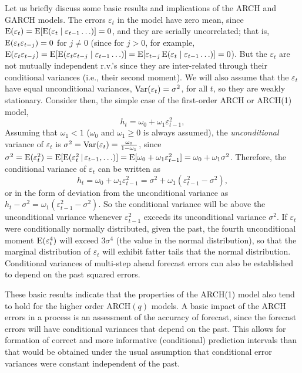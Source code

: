 Let us briefly discuss some basic results and implications of the ARCH and GARCH models.\label{in:garch_model} The errors $\varepsilon_t$ in the model have zero mean, since $\operatorname{E}(\varepsilon_t) = \operatorname{E}[\operatorname{E}(\varepsilon_t \;|\; \varepsilon_{t-1} \ldots)] = 0$, and they are serially uncorrelated; that is, $\operatorname{E}(\varepsilon_t \varepsilon_{t-j}) = 0$ for $j \not= 0$ (since for $j > 0$, for example, $\operatorname{E}(\varepsilon_t \varepsilon_{t-j}) = \operatorname{E}[\operatorname{E}(\varepsilon_t \varepsilon_{t-j} \;|\; \varepsilon_{t-1} \ldots)] = \operatorname{E}[\varepsilon_{t-j} \operatorname{E}(\varepsilon_t \;|\; \varepsilon_{t-1} \ldots)] = 0$). But the $\varepsilon_t$ are not mutually independent r.v.'s since they are inter-related through their conditional variances (i.e., their second moment). We will also assume that the $\varepsilon_t$ have equal unconditional variances, $\operatorname{Var}(\varepsilon_t) = \sigma^2$, for all $t$, so they are weakly stationary. Consider then, the simple case of the first-order ARCH or ARCH(1) model,
	\begin{equation} \label{eqn:2htE}
	h_t = \omega_0 + \omega_1 \varepsilon_{t-1}^2,
	\end{equation}
Assuming that $\omega_1 < 1$ ($\omega_0$ and $\omega_1 \geq 0$ is always assumed), the \emph{unconditional} variance of $\varepsilon_t$ is $\sigma^2= \operatorname{Var}(\varepsilon_t) = \frac{\omega_0}{1 - \omega_1}$, since $\sigma^2 = \operatorname{E}(\varepsilon_t^2) = \operatorname{E}[\operatorname{E}(\varepsilon_t^2 \,|\, \varepsilon_{t-1}, \ldots)] = \operatorname{E}[\omega_0 + \omega_1\varepsilon_{t-1}^2] = \omega_0 + \omega_1\sigma^2$. Therefore, the conditional variance of $\varepsilon_t$ can be written as
	\begin{equation} \label{eqn:2htw}
	h_t = \omega_0 + \omega_1 \varepsilon_{t-1}^2 = \sigma^2 + \omega_1 (\varepsilon_{t-1}^2 - \sigma^2),
	\end{equation}
or in the form of deviation from the unconditional variance as $h_t - \sigma^2= \omega_1 (\varepsilon_{t-1}^2 - \sigma^2)$. So the conditional variance will be above the unconditional variance whenever $\varepsilon_{t-1}^2$ exceeds its unconditional variance $\sigma^2$. If $\varepsilon_t$ were conditionally normally distributed, given the past, the fourth unconditional moment $\operatorname{E}(\varepsilon_t^4)$ will exceed $3 \sigma^4$ (the value in the normal distribution), so that the marginal distribution of $\varepsilon_t$ will exhibit fatter tails that the normal distribution. Conditional variances of multi-step ahead forecast errors can also be established to depend on the past squared errors. 


These basic results indicate that the properties of the ARCH(1) model also tend to hold for the higher order ARCH$(q)$ models. A basic impact of the ARCH errors in a process is an assessment of the accuracy of forecast, since the forecast errors will have conditional variances that depend on the past. This allows for formation of correct and more informative (conditional) prediction intervals than that would be obtained under the usual assumption that conditional error variances were constant independent of the past.


